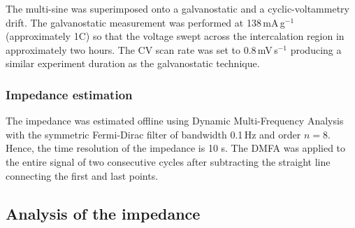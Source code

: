 The multi-sine was superimposed onto a galvanostatic and a cyclic-voltammetry drift. The galvanostatic measurement was performed at 138\,mA\,g$^{-1}$ (approximately 1C) so that the voltage swept across the intercalation region in approximately two hours. The CV scan rate was set to 0.8\,mV\,s$^{-1}$ producing a similar experiment duration as the galvanostatic technique. 


\subsubsection{Impedance estimation}

The impedance was estimated offline using Dynamic Multi-Frequency Analysis with the symmetric Fermi-Dirac filter of bandwidth 0.1\,Hz and order $n=8$. Hence, the time resolution of the impedance is 10 s. The DMFA was applied to the entire signal of two consecutive cycles after subtracting the straight line connecting the first and last points.

\subsection{Analysis of the impedance}
